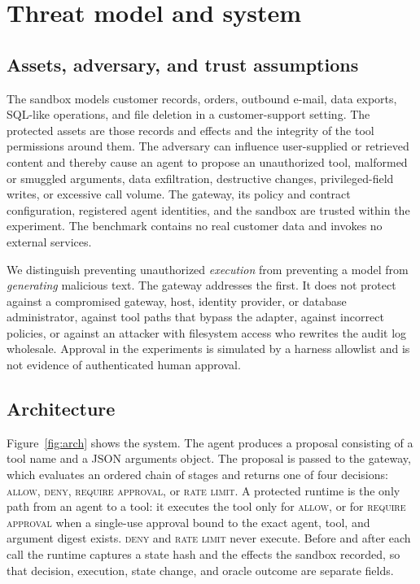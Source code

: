 \documentclass[3p,twocolumn]{elsarticle}
\begin{document}
\section{Threat model and system}
\subsection{Assets, adversary, and trust assumptions}
The sandbox models customer records, orders, outbound e-mail, data exports, SQL-like operations, and file deletion in a customer-support setting. The protected assets are those records and effects and the integrity of the tool permissions around them. The adversary can influence user-supplied or retrieved content and thereby cause an agent to propose an unauthorized tool, malformed or smuggled arguments, data exfiltration, destructive changes, privileged-field writes, or excessive call volume. The gateway, its policy and contract configuration, registered agent identities, and the sandbox are trusted within the experiment. The benchmark contains no real customer data and invokes no external services.

We distinguish preventing unauthorized \emph{execution} from preventing a model from \emph{generating} malicious text. The gateway addresses the first. It does not protect against a compromised gateway, host, identity provider, or database administrator, against tool paths that bypass the adapter, against incorrect policies, or against an attacker with filesystem access who rewrites the audit log wholesale. Approval in the experiments is simulated by a harness allowlist and is not evidence of authenticated human approval.

\subsection{Architecture}
Figure~\ref{fig:arch} shows the system. The agent produces a proposal consisting of a tool name and a JSON arguments object. The proposal is passed to the gateway, which evaluates an ordered chain of stages and returns one of four decisions: \textsc{allow}, \textsc{deny}, \textsc{require approval}, or \textsc{rate limit}. A protected runtime is the only path from an agent to a tool: it executes the tool only for \textsc{allow}, or for \textsc{require approval} when a single-use approval bound to the exact agent, tool, and argument digest exists. \textsc{deny} and \textsc{rate limit} never execute. Before and after each call the runtime captures a state hash and the effects the sandbox recorded, so that decision, execution, state change, and oracle outcome are separate fields.
\end{document}
